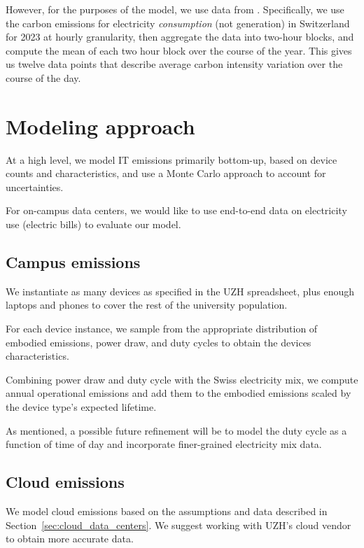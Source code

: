 \documentclass[11pt]{article}
\begin{document}
However, for the purposes of the model, we use data from \textcite{electricitymaps}. Specifically,
we use the carbon emissions for electricity {\em consumption} (not generation) in Switzerland for 2023
at hourly granularity, then aggregate the data into two-hour blocks, and compute the mean of each two
hour block over the course of the year. This gives us twelve data points that describe average
carbon intensity variation over the course of the day.

\section{Modeling approach}

At a high level, we model IT emissions primarily bottom-up, based on device counts and
characteristics, and use a Monte Carlo approach to account for uncertainties.

For on-campus data centers, we would like to use end-to-end data on electricity use (electric bills)
to evaluate our model.

\subsection{Campus emissions}

We instantiate as many devices as specified in the UZH spreadsheet, plus enough laptops and phones
to cover the rest of the university population.

For each device instance, we sample from the appropriate distribution of embodied emissions,
power draw, and duty cycles to obtain the devices characteristics.

Combining power draw and duty cycle with the Swiss electricity mix, we compute annual operational
emissions and add them to the embodied emissions scaled by the device type's expected lifetime.

As mentioned, a possible future refinement will be to model the duty cycle as a function of time of day
and incorporate finer-grained electricity mix data.

\subsection{Cloud emissions}

We model cloud emissions based on the assumptions and data described in
Section~\ref{sec:cloud_data_centers}. We suggest working with UZH's cloud vendor to obtain
more accurate data.
\end{document}
